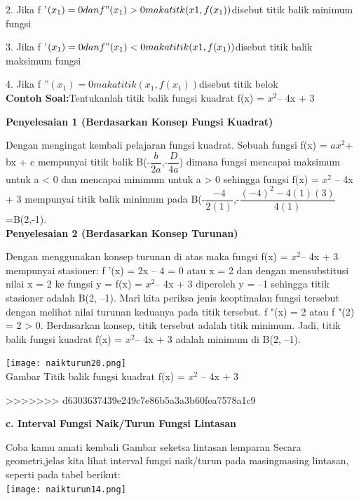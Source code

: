 \documentclass[11pt,fleqn]{book} %
\begin{document}
2. Jika f '$(x_{1}) = 0 dan f "(x_{1}) > 0 maka titk (x1, f(x_{1}))$disebut titik balik minimum fungsi

3. Jika f '$(x_{1}) = 0 dan f "(x_{1}) < 0 maka titik (x1, f(x_{1}))$disebut titik balik maksimum fungsi

4. Jika f ''$(x_{1}) = 0 maka titik (x_{1}, f(x_{1})) $disebut titik belok\\

\textbf{Contoh Soal:}Tentukanlah titik balik fungsi kuadrat f(x) = $x^{2} $– 4x + 3

\textbf{Penyelesaian 1 (Berdasarkan Konsep
Fungsi Kuadrat)}

Dengan mengingat kembali pelajaran fungsi kuadrat.
Sebuah fungsi f(x) = $ax^{2} $+ bx + c mempunyai titik balik B(-$\dfrac{b}{2a}$,-$\dfrac{D}{4a}$) dimana fungsi mencapai maksimum untuk a < 0 dan mencapai minimum untuk a > 0 sehingga fungsi
f(x) = $x^{2}$ – 4x + 3 mempunyai titik balik minimum pada B(-$\dfrac{-4}{2(1)}$,-$\dfrac{(-4)^{2}-4(1)(3)}{4(1)}$=B(2,-1).\\

\textbf{Penyelesaian 2 (Berdasarkan Konsep
Turunan)}

Dengan menggunakan konsep turunan di atas maka
fungsi f(x) = $x^{2} $– 4x + 3 mempunyai stasioner: f '(x) = 2x – 4 = 0 atau x = 2 dan dengan mensubstitusi nilai x = 2 ke fungsi y = f(x) = $x^{2} $– 4x + 3 diperoleh y = –1 sehingga titik stasioner adalah B(2, –1). Mari kita periksa jenis keoptimalan fungsi tersebut dengan melihat nilai turunan keduanya pada titik tersebut. f "(x) = 2 atau f "(2) = 2 > 0.
Berdasarkan konsep, titik tersebut adalah titik minimum. Jadi, titik balik fungsi kuadrat f(x) = $x^{2} $– 4x + 3 adalah minimum di B(2, –1).

\begin{center}
\texttt{[image: naikturun20.png]}\\
Gambar Titik balik fungsi kuadrat f(x) = $x^{2}$ – 4x + 3
\end{center}
>>>>>>> d6303637439e249c7e86b5a3a3b60fea7578a1c9

\textbf{c. Interval Fungsi Naik/Turun Fungsi Lintasan}

Coba kamu amati kembali Gambar seketsa lintasan lemparan Secara geometri,jelas kita lihat interval fungsi naik/turun pada masingmasing lintasan, seperti pada tabel berikut:\\

\texttt{[image: naikturun14.png]}\\
\end{document}
